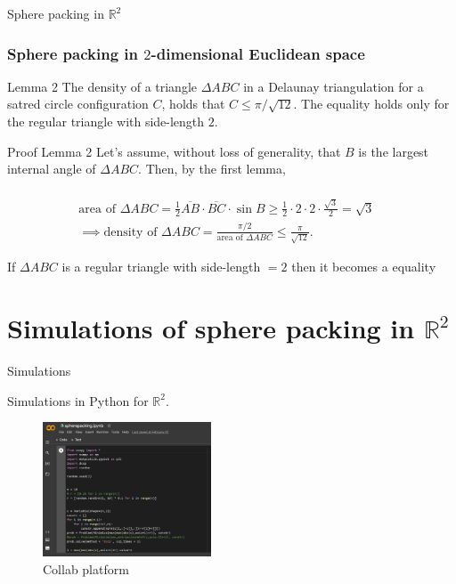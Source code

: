 \documentclass[10pt]{beamer}
\begin{document}
\begin{frame}{Sphere packing in $\mathbb{R}^2$}
    \frametitle{Sphere packing in $2$-dimensional Euclidean space}
    
    \begin{block}{Lemma 2}
    The density of a triangle $\Delta ABC$ in a Delaunay triangulation for a satred circle configuration $C$, holds that $C \leq \pi / \sqrt{12}$. The equality holds only for the regular triangle with side-length $2$.
    \end{block}
    
    \begin{block}{Proof Lemma 2}
    Let's assume, without loss of generality, that $B$ is the largest internal angle of $\Delta ABC$. Then, by the first lemma, 
    
    \begin{equation} \label{6.3}
    \begin{split}
        \\ \text{area of } \Delta ABC = \frac{1}{2} \overline{AB} \cdot \overline{BC} \cdot \sin B \geq \frac{1}{2} \cdot 2 \cdot 2 \cdot \frac{\sqrt{3}}{2} = \sqrt{3} &
        \\ \implies \text{density of } \Delta ABC = \frac{\pi / 2}{\text{area of } \Delta ABC} \leq \frac{\pi}{\sqrt{12}}. & 
    \end{split} 
    \end{equation}
    
    If $\Delta ABC$ is a regular triangle with side-length $ = 2$ then it becomes a equality
    
    \end{block}
\end{frame}

\section{Simulations of sphere packing in $\mathbb{R}^2$}
\begin{frame}{Simulations}


Simulations in Python for $\mathbb{R}^2$.

\begin{figure}[t]
    \includegraphics[width=5cm]{code.png}
    \centering
    \caption{Collab platform}
    \end{figure}
    
\href{https://colab.research.google.com/drive/1C3HyFZRLydt18go0Bki9KnKzpY5WKpE3?usp=sharing}{\LARGE{}}
\end{frame}
\end{document}
